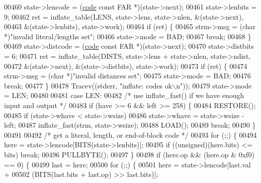 \begin{DoxyCode}
{{{{00460             state->lencode = (\hyperlink{structcode}{code} \textcolor{keyword}{const} FAR *)(state->next);
00461             state->lenbits = 9;
00462             ret = inflate\_table(LENS, state->lens, state->nlen, &(state->next),
00463                                 &(state->lenbits), state->work);
00464             \textcolor{keywordflow}{if} (ret) \{
00465                 strm->msg = (\textcolor{keywordtype}{char} *)\textcolor{stringliteral}{"invalid literal/lengths set"};
00466                 state->mode = BAD;
00467                 \textcolor{keywordflow}{break};
00468             \}
00469             state->distcode = (\hyperlink{structcode}{code} \textcolor{keyword}{const} FAR *)(state->next);
00470             state->distbits = 6;
00471             ret = inflate\_table(DISTS, state->lens + state->nlen, state->ndist,
00472                             &(state->next), &(state->distbits), state->work);
00473             \textcolor{keywordflow}{if} (ret) \{
00474                 strm->msg = (\textcolor{keywordtype}{char} *)\textcolor{stringliteral}{"invalid distances set"};
00475                 state->mode = BAD;
00476                 \textcolor{keywordflow}{break};
00477             \}
00478             Tracev((stderr, \textcolor{stringliteral}{"inflate:       codes ok\(\backslash\)n"}));
00479             state->mode = LEN;
00480 
00481         \textcolor{keywordflow}{case} LEN:
00482             \textcolor{comment}{/* use inflate\_fast() if we have enough input and output */}
00483             \textcolor{keywordflow}{if} (have >= 6 && left >= 258) \{
00484                 RESTORE();
00485                 \textcolor{keywordflow}{if} (state->whave < state->wsize)
00486                     state->whave = state->wsize - left;
00487                 inflate\_fast(strm, state->wsize);
00488                 LOAD();
00489                 \textcolor{keywordflow}{break};
00490             \}
00491 
00492             \textcolor{comment}{/* get a literal, length, or end-of-block code */}
00493             \textcolor{keywordflow}{for} (;;) \{
00494                 here = state->lencode[BITS(state->lenbits)];
00495                 \textcolor{keywordflow}{if} ((\textcolor{keywordtype}{unsigned})(here.bits) <= bits) \textcolor{keywordflow}{break};
00496                 PULLBYTE();
00497             \}
00498             \textcolor{keywordflow}{if} (here.op && (here.op & 0xf0) == 0) \{
00499                 last = here;
00500                 \textcolor{keywordflow}{for} (;;) \{
00501                     here = state->lencode[last.val +
00502                             (BITS(last.bits + last.op) >> last.bits)];
}}}}
\end{DoxyCode}
